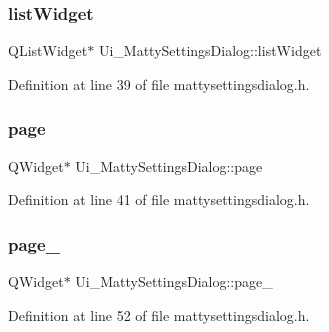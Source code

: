 \hypertarget{classUi__MattySettingsDialog_a092ef7dfa48ae9c8aad4606690c1e6db}{}\label{classUi__MattySettingsDialog_a092ef7dfa48ae9c8aad4606690c1e6db} 
\subsubsection{\texorpdfstring{list\+Widget}{listWidget}}
{\footnotesize\ttfamily Q\+List\+Widget$\ast$ Ui\+\_\+\+Matty\+Settings\+Dialog\+::list\+Widget}



Definition at line 39 of file mattysettingsdialog.\+h.

\hypertarget{classUi__MattySettingsDialog_a3ce6395ee3087c88bf0421568d3f2073}{}\label{classUi__MattySettingsDialog_a3ce6395ee3087c88bf0421568d3f2073} 
\subsubsection{\texorpdfstring{page}{page}}
{\footnotesize\ttfamily Q\+Widget$\ast$ Ui\+\_\+\+Matty\+Settings\+Dialog\+::page}



Definition at line 41 of file mattysettingsdialog.\+h.

\hypertarget{classUi__MattySettingsDialog_aba08ff4b8b0204e78668803d29a99daf}{}\label{classUi__MattySettingsDialog_aba08ff4b8b0204e78668803d29a99daf} 
\subsubsection{\texorpdfstring{page\+\_}{page\_2}}
{\footnotesize\ttfamily Q\+Widget$\ast$ Ui\+\_\+\+Matty\+Settings\+Dialog\+::page\+\_}



Definition at line 52 of file mattysettingsdialog.\+h.

\hypertarget{classUi__MattySettingsDialog_af7fb1de089a082c312ab417fe3f850dc}{}\label{classUi__MattySettingsDialog_af7fb1de089a082c312ab417fe3f850dc} 
